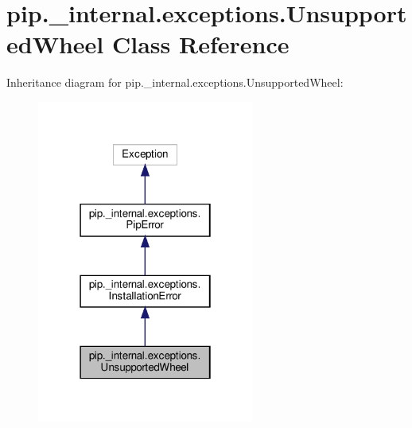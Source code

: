 \hypertarget{classpip_1_1__internal_1_1exceptions_1_1UnsupportedWheel}{}\section{pip.\+\_\+internal.\+exceptions.\+Unsupported\+Wheel Class Reference}
\label{classpip_1_1__internal_1_1exceptions_1_1UnsupportedWheel}


Inheritance diagram for pip.\+\_\+internal.\+exceptions.\+Unsupported\+Wheel\+:
\nopagebreak
\begin{figure}[H]
\begin{center}
\leavevmode
\includegraphics[width=202pt]{classpip_1_1__internal_1_1exceptions_1_1UnsupportedWheel__inherit__graph}
\end{center}
\end{figure}


